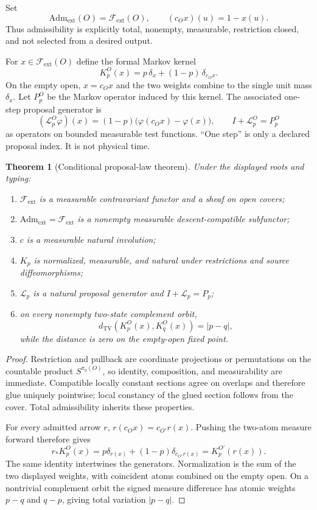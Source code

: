 \documentclass[11pt]{article}
\newtheorem{theorem}{Theorem}
\newcommand{\Fext}{\mathcal F_{\mathrm{ext}}}
\newcommand{\Adm}{\mathrm{Adm}_{\mathrm{ext}}}
\newcommand{\Kext}{K_{p}}
\newcommand{\Gen}{\mathcal L_{p}}
\begin{document}
Set
\[
 \Adm(O)=\Fext(O), \qquad (c_Ox)(u)=1-x(u).
\]
Thus admissibility is explicitly total, nonempty, measurable, restriction
closed, and not selected from a desired output.

For $x\in\Fext(O)$ define the formal Markov kernel
\[
 \Kext^{O}(x)=p\,\delta_x+(1-p)\,\delta_{c_Ox}.
\]
On the empty open, $x=c_Ox$ and the two weights combine to the single unit mass
$\delta_x$.  Let $P_p^O$ be the Markov operator induced by this kernel.  The
associated one-step proposal generator is
\[
 (\Gen^{O}\varphi)(x)
   =(1-p)\bigl(\varphi(c_Ox)-\varphi(x)\bigr),
 \qquad I+\Gen^{O}=P_p^O
\]
as operators on bounded measurable test functions.  ``One step'' is only a
declared proposal index.  It is not physical time.

\begin{theorem}[Conditional proposal-law theorem]
Under the displayed roots and typing:
\begin{enumerate}
\setlength{\itemsep}{0.15em}
\setlength{\parskip}{0pt}
\item $\Fext$ is a measurable contravariant functor and a sheaf on open covers;
\item $\Adm=\Fext$ is a nonempty measurable descent-compatible subfunctor;
\item $c$ is a measurable natural involution;
\item $\Kext$ is normalized, measurable, and natural under restrictions and
source diffeomorphisms;
\item $\Gen$ is a natural proposal generator and $I+\Gen=P_p$;
\item on every nonempty two-state complement orbit,
\[
 d_{\mathrm{TV}}\!\left(K_p^O(x),K_q^O(x)\right)=|p-q|,
\]
while the distance is zero on the empty-open fixed point.
\end{enumerate}
\end{theorem}

\begin{proof}
Restriction and pullback are coordinate projections or permutations on the
countable product $S^{\pi_0(O)}$, so identity, composition, and measurability
are immediate.  Compatible locally constant sections agree on overlaps and
therefore glue uniquely pointwise; local constancy of the glued section follows
from the cover.  Total admissibility inherits these properties.

For every admitted arrow $r$,
$r(c_Ox)=c_{O'}r(x)$.  Pushing the two-atom measure forward therefore gives
\[
 r_*K_p^O(x)=p\delta_{r(x)}+(1-p)\delta_{c_{O'}r(x)}
             =K_p^{O'}(r(x)).
\]
The same identity intertwines the generators.  Normalization is the sum of the
two displayed weights, with coincident atoms combined on the empty open.  On a
nontrivial complement orbit the signed measure difference has atomic weights
$p-q$ and $q-p$, giving total variation $|p-q|$.
\end{proof}
\end{document}
